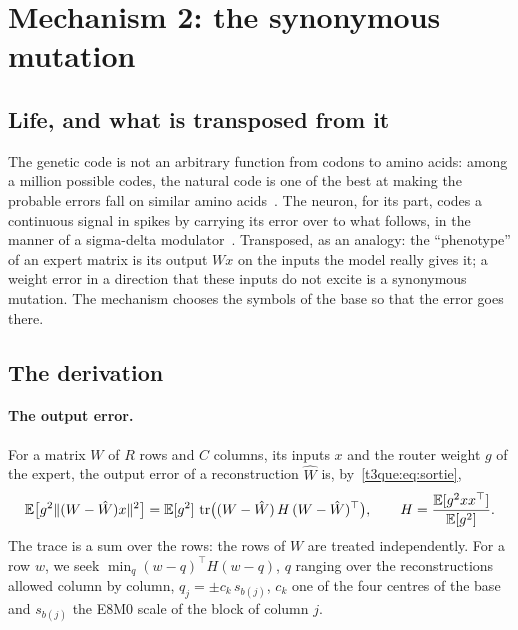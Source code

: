 \section{Mechanism 2: the synonymous mutation}\label{t3ecl:sec:mutation}

\subsection{Life, and what is transposed from it}

The genetic code is not an arbitrary function from codons to amino acids: among a million possible codes, the natural code is one of the best at making the probable errors fall on similar amino acids~\cite{freeland1998}. The neuron, for its part, codes a continuous signal in spikes by carrying its error over to what follows, in the manner of a sigma-delta modulator~\cite{yoon2017sigmadelta}. Transposed, as an analogy: the ``phenotype'' of an expert matrix is its output $Wx$ on the inputs the model really gives it; a weight error in a direction that these inputs do not excite is a synonymous mutation. The mechanism chooses the symbols of the base so that the error goes there.

\subsection{The derivation}

\paragraph{The output error.} For a matrix $W$ of $R$ rows and $C$ columns, its inputs $x$ and the router weight $g$ of the expert, the output error of a reconstruction $\hat W$ is, by~\eqref{t3que:eq:sortie},
\begin{equation}\label{t3ecl:eq:erreur}
\mathbb{E}\bigl[g^2 \|(W - \hat W) x\|^2\bigr] = \mathbb{E}[g^2]\ \mathrm{tr}\bigl((W - \hat W)\, H\, (W - \hat W)^\top\bigr), \qquad H = \frac{\mathbb{E}[g^2 x x^\top]}{\mathbb{E}[g^2]} .
\end{equation}
The trace is a sum over the rows: the rows of $W$ are treated independently. For a row $w$, we seek $\min_q (w - q)^\top H (w - q)$, $q$ ranging over the reconstructions allowed column by column, $q_j = \pm c_k\, s_{b(j)}$, $c_k$ one of the four centres of the base and $s_{b(j)}$ the E8M0 scale of the block of column $j$.

